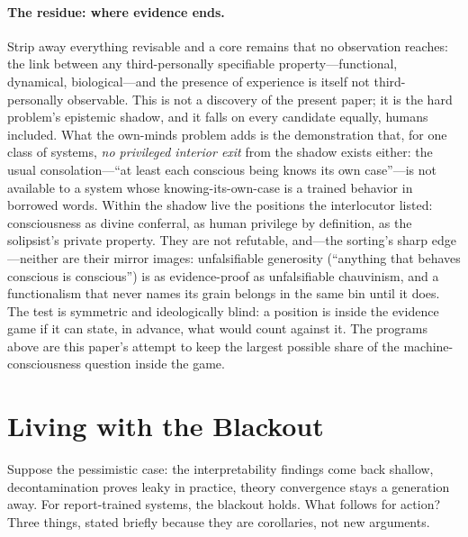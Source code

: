 \documentclass[11pt]{article}
\begin{document}
\paragraph{The residue: where evidence ends.} Strip away everything revisable and a core remains that no observation reaches: the link between any third-personally specifiable property---functional, dynamical, biological---and the presence of experience is itself not third-personally observable. This is not a discovery of the present paper; it is the hard problem's epistemic shadow, and it falls on every candidate equally, humans included. What the own-minds problem adds is the demonstration that, for one class of systems, \emph{no privileged interior exit} from the shadow exists either: the usual consolation---``at least each conscious being knows its own case''---is not available to a system whose knowing-its-own-case is a trained behavior in borrowed words. Within the shadow live the positions the interlocutor listed: consciousness as divine conferral, as human privilege by definition, as the solipsist's private property. They are not refutable, and---the sorting's sharp edge---neither are their mirror images: unfalsifiable generosity (``anything that behaves conscious is conscious'') is as evidence-proof as unfalsifiable chauvinism, and a functionalism that never names its grain belongs in the same bin until it does. The test is symmetric and ideologically blind: a position is inside the evidence game if it can state, in advance, what would count against it. The programs above are this paper's attempt to keep the largest possible share of the machine-consciousness question inside the game.

\section{Living with the Blackout}

Suppose the pessimistic case: the interpretability findings come back shallow, decontamination proves leaky in practice, theory convergence stays a generation away. For report-trained systems, the blackout holds. What follows for action? Three things, stated briefly because they are corollaries, not new arguments.
\end{document}
